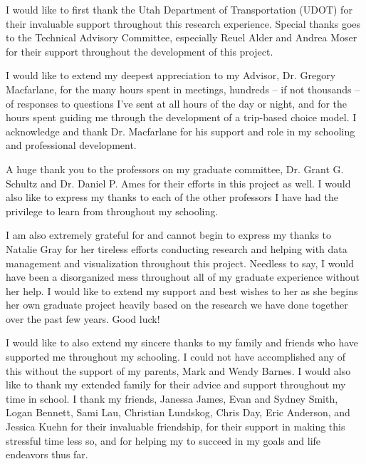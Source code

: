 \afterpage{\cleardoublepage}
%
 I would like to first thank the Utah Department of Transportation (UDOT) for
 their invaluable support throughout this research experience. Special thanks
 goes to the Technical Advisory Committee, especially Reuel Alder and Andrea
 Moser for their support throughout the development of this project.

 I would like to extend my deepest appreciation to my Advisor, Dr. Gregory
 Macfarlane, for the many hours spent in meetings, hundreds -- if not thousands
 -- of responses to questions I've sent at all hours of the day or night, and
 for the hours spent guiding me through the development of a trip-based choice
 model. I acknowledge and thank Dr. Macfarlane for his support and role in my
 schooling and professional development.

A huge thank you to the professors on my graduate committee, Dr. Grant G.
Schultz and Dr. Daniel P. Ames for their efforts in this project as well. I
would also like to express my thanks to each of the other professors I have
had the privilege to learn from throughout my schooling.

 I am also extremely grateful for and cannot begin to express my thanks to
 Natalie Gray for her tireless efforts conducting research and helping with
 data management and visualization throughout this project. Needless to say,
 I would have been a disorganized mess throughout all of my graduate experience
 without her help. I would like to extend my support and best wishes to her as
 she begins her own graduate project heavily based on the research we have done
 together over the past few years. Good luck!

I would like to also extend my sincere thanks to my family and friends who have
supported me throughout my schooling. I could not have accomplished any of this
without the support of my parents, Mark and Wendy Barnes. I would also like to
thank my extended family for their advice and support throughout my time in
school. I thank my friends, Janessa James, Evan and Sydney Smith, Logan Bennett,
Sami Lau, Christian Lundskog, Chris Day, Eric Anderson, and Jessica Kuehn for
their invaluable friendship, for their support in making this stressful time
less so, and for helping my to succeed in my goals and life endeavors thus far.
